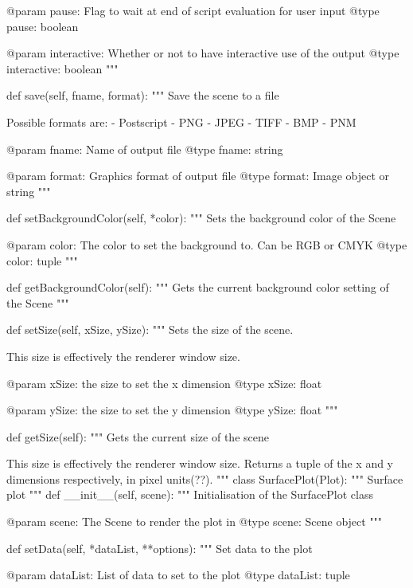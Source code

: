 \begin{python}
\begin{python}
\begin{verbose}
        @param pause: Flag to wait at end of script evaluation for user input
        @type pause: boolean

        @param interactive: Whether or not to have interactive use of the output
        @type interactive: boolean
        """

    def save(self, fname, format):
        """
        Save the scene to a file

        Possible formats are:
            - Postscript
            - PNG
            - JPEG
            - TIFF
            - BMP
            - PNM

        @param fname: Name of output file
        @type fname: string

        @param format: Graphics format of output file
        @type format: Image object or string
        """

    def setBackgroundColor(self, *color):
        """
        Sets the background color of the Scene

        @param color: The color to set the background to.  Can be RGB or CMYK
        @type color: tuple
        """

    def getBackgroundColor(self):
        """
        Gets the current background color setting of the Scene
        """

    def setSize(self, xSize, ySize):
        """
        Sets the size of the scene.

        This size is effectively the renderer window size.

        @param xSize: the size to set the x dimension
        @type xSize: float

        @param ySize: the size to set the y dimension
        @type ySize: float
        """

    def getSize(self):
        """
        Gets the current size of the scene

        This size is effectively the renderer window size.  Returns a tuple
        of the x and y dimensions respectively, in pixel units(??).
        """
class SurfacePlot(Plot):
    """
    Surface plot
    """
    def __init__(self, scene):
        """
        Initialisation of the SurfacePlot class
        
        @param scene: The Scene to render the plot in
        @type scene: Scene object
        """

    def setData(self, *dataList, **options):
        """
        Set data to the plot

        @param dataList: List of data to set to the plot
        @type dataList: tuple


\end{verbose}
\end{python}
\end{python}
